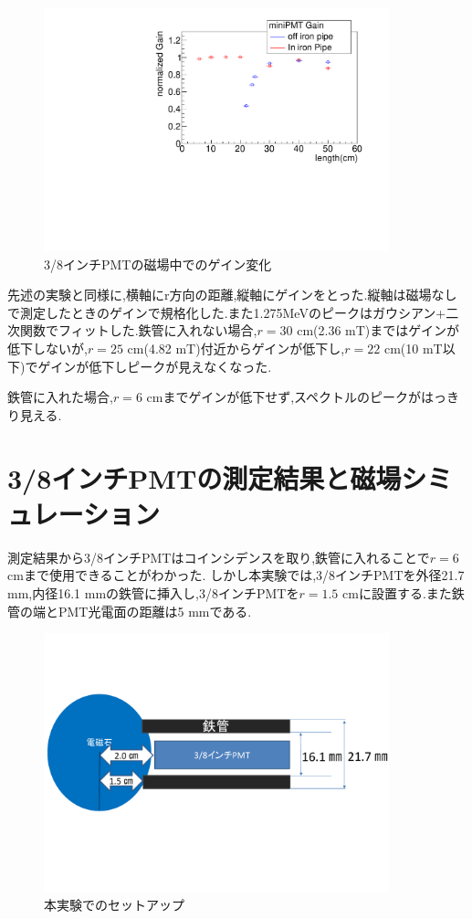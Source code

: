 \begin{figure}[h]
	\centering
		\includegraphics[angle=-90,width=10cm]{fig/iguchi/miniPMTgainG.pdf}
	\caption{3/8インチPMTの磁場中でのゲイン変化}
	\label{miniPMTgainG}
\end{figure}

先述の実験と同様に,横軸にr方向の距離,縦軸にゲインをとった.縦軸は磁場なしで測定したときのゲインで規格化した.また1.275MeVのピークはガウシアン+二次関数でフィットした.鉄管に入れない場合,$r=30$ cm(2.36 mT)まではゲインが低下しないが,$r=25$ cm(4.82 mT)付近からゲインが低下し,$r=22$ cm(10 mT以下)でゲインが低下しピークが見えなくなった.

鉄管に入れた場合,$r=6$ cmまでゲインが低下せず,スペクトルのピークがはっきり見える.


\section{3/8インチPMTの測定結果と磁場シミュレーション}
測定結果から3/8インチPMTはコインシデンスを取り,鉄管に入れることで$r=6$ cmまで使用できることがわかった.
しかし本実験では,3/8インチPMTを外径21.7 mm,内径16.1 mmの鉄管に挿入し,3/8インチPMTを$r=1.5$ cmに設置する.また鉄管の端とPMT光電面の距離は5 mmである.

\begin{figure}[H]
	\centering
		\includegraphics[width=10cm]{fig/iguchi/honjikken.pdf}
	\caption{本実験でのセットアップ}
	\label{honjikken}
\end{figure}

